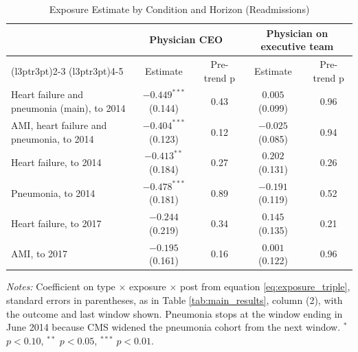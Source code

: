 \begin{table}

\caption{\label{tab:app_conditions}Exposure Estimate by Condition and Horizon (Readmissions)}
\centering
\begin{threeparttable}
\begin{tabular}[t]{lcccc}
\toprule
\multicolumn{1}{c}{ } & \multicolumn{2}{c}{Physician CEO} & \multicolumn{2}{c}{Physician on executive team} \\
\cmidrule(l{3pt}r{3pt}){2-3} \cmidrule(l{3pt}r{3pt}){4-5}
 & Estimate & Pre-trend p & Estimate & Pre-trend p\\
\midrule
Heart failure and pneumonia (main), to 2014 & $-0.449^{***}$ (0.144) & 0.43 & $0.005$ (0.099) & 0.96\\
AMI, heart failure and pneumonia, to 2014 & $-0.404^{***}$ (0.123) & 0.12 & $-0.025$ (0.085) & 0.94\\
Heart failure, to 2014 & $-0.413^{**}$ (0.184) & 0.27 & $0.202$ (0.131) & 0.26\\
Pneumonia, to 2014 & $-0.478^{***}$ (0.181) & 0.89 & $-0.191$ (0.119) & 0.52\\
Heart failure, to 2017 & $-0.244$ (0.219) & 0.34 & $0.145$ (0.135) & 0.21\\
AMI, to 2017 & $-0.195$ (0.161) & 0.16 & $0.001$ (0.122) & 0.96\\
\bottomrule
\end{tabular}
\begin{tablenotes}[flushleft]
\footnotesize
\item \textit{Notes:} Coefficient on type $\times$ exposure $\times$ post from equation \eqref{eq:exposure_triple}, standard errors in parentheses, as in Table \ref{tab:main_results}, column (2), with the outcome and last window shown. Pneumonia stops at the window ending in June 2014 because CMS widened the pneumonia cohort from the next window. $^{*}$ $p<0.10$, $^{**}$ $p<0.05$, $^{***}$ $p<0.01$.
\end{tablenotes}
\end{threeparttable}
\end{table}
